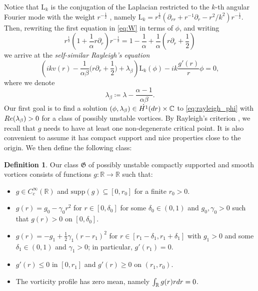 \documentclass[11pt,reqno]{amsproc}
\def\dd{{\rm d}}
\def\de{{\partial}}
\def\RR {\mathbb{R}}
\def\Re{{\rm Re}}
\newcommand{\rmL}{\mathrm{L}}
\theoremstyle{definition}
\newtheorem{definition}[proposition]{Definition}
\theoremstyle{definition}
\numberwithin{equation}{section}
\begin{document}
Notice that $\rmL_k$ is  the conjugation of the Laplacian restricted to the $k$-th angular Fourier mode with the weight $r^{-\frac12}$ , namely $\rmL_k=r^\frac12(\de_{rr}+r^{-1}\de_r-r^2/k^2)r^{-\frac12}.$
Then, rewriting the first equation in \cref{eq:W}  in terms of $\phi$, and writing $$
r^{\frac12}(1+\frac{1}{\alpha}r\de_r)r^{-\frac12}=1-\frac{1}{\alpha}+\frac{1}{\alpha}(r\de_r+\frac12)$$
we arrive at the 
\emph{self-similar Rayleigh's equation}
\begin{equation}
\label{eq:rayleigh_phi}
\left(ikv(r) - \frac{1}{\alpha\beta} \big(r\partial_r + \frac{1}{2}\big) +\lambda_\beta\right)\rmL_k(\phi)-ik\frac{g'(r)}{r}\phi=0,
\end{equation}
where we denote 
\begin{equation}
    \label{def:lambdabeta}    \lambda_\beta\coloneqq\lambda-\frac{\alpha-1}{\alpha\beta}.
\end{equation}
Our first goal is to find a solution $(\phi,\lambda_\beta) \in \dot{H^1}(\dd r)\times \mathbb{C}$ to \cref{eq:rayleigh_phi} with $\Re(\lambda_\beta)>0$ for a class of possibly unstable vortices.  By Rayleigh's criterion \cite{marchioropulvirenti}, we recall that $g$ needs to have at least one non-degenerate critical point. It is also convenient to assume it has compact support and nice properties close to the origin.  We then define the following class:

\begin{definition}
\label{def:class} Our class $\mathfrak{G}$ of possibly unstable compactly supported and smooth vortices consists of functions $g:\RR\to \RR$ such that:
\begin{itemize}
    \item[i)] $g\in C^\infty_c(\RR)$ and $\mathrm{supp}(g)\subseteq[0,r_0]$ for a finite $r_0>0$.
    \item[ii)] $g(r)=g_0-\gamma_0r^2$ for $r\in [0,\delta_0]$ for some $\delta_0\in (0,1)$ and $g_0,\gamma_0>0$ such that $g(r)>0$ on $[0,\delta_0]$.
    \item[iii)] $g(r)=-g_1+\tfrac12\gamma_1(r-r_1)^2$ for $r\in[r_1-\delta_1,r_1+\delta_1]$ with $g_1>0$ and some $\delta_1\in (0,1)$ and $\gamma_1>0$; in particular, $g'(r_1)=0$. 
    \item[iv)]  $g'(r)\leq0 $ in $[0,r_1]$ and $g'(r)\geq 0$ on $(r_1,r_0)$.  
   \item[v)] The vorticity profile has zero mean, namely $\int_{\RR}g(r)r \dd r=0$.
    \end{itemize}
\end{definition}
\end{document}
